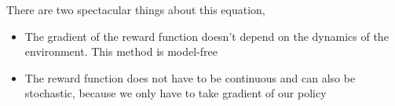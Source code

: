 \documentclass[graybox]{svmult}
\begin{document}
There are two spectacular things about this equation,

\begin{itemize}
\item The gradient of the reward function doesn't depend on the dynamics of the environment. This method is model-free
\item The reward function does not have to be continuous and can also be stochastic, because we only have to take gradient of our policy
\end{itemize}
\end{document}
